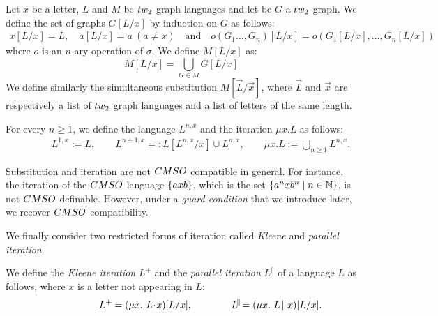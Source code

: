  \begin{definition}
  Let $x$ be a letter, $L$ and $M$ be $\TWT$ graph languages and let be $G$ a $\TWT$ graph. We define the set of graphs $G[L/x]$ by induction on $G$ as follows:
\begin{align*}
x[L/x]=L, \quad a[L/x]=a\ (a\neq x)\quad\text{and}\quad o(G_1\dots, G_n)[L/x]=o(G_1[L/x],\dots,G_n[L/x])  
\end{align*}
where $o$ is an $n$-ary operation of $\sigma$. We define $M[L/x]$ as:
$$ M[L/x]=\underset{G\in M}{\bigcup} G[L/x]$$
We define similarly the simultaneous  substitution $M[\vec{L}/\vec{x}]$, where $\vec{L}$ and $\vec{x}$ are  respectively a list of $\TWT$ graph languages and a list of letters of the same length.  
\smallskip

For every $n\geq 1$, we define the language $L^{n,x}$ and the iteration $\mu x. L$ as follows:
\begin{align*}
\qquad \qquad L^{1,x}:=L,\qquad L^{n+1,x}=:L[L^{n,x}/x]\cup L^{n,x}, \qquad \mu x. L:= \underset{n\geq 1}{\bigcup} L^{n,x}.
\end{align*}
\end{definition}


\begin{remark}
Substitution and iteration are not $\CMSO$ compatible in general. For instance, the iteration of the $\CMSO$ language $\left\{axb\right\}$, which is the set  $\left\{a^nxb^n \mid n\in \mathbb{N}\right\}$, is not $\CMSO$ definable.  
However, under a \emph{guard condition} that we introduce later, we recover $\CMSO$ compatibility.
\end{remark}

We finally consider two restricted forms of iteration called \emph{Kleene} and  \emph{parallel iteration}.

\begin{definition}
We define the \emph{Kleene iteration} $L^+$ and the \emph{parallel iteration} $L^\parallel$ of a language $L$ as follows, where $x$ is a letter not appearing in $L$:
\begin{align*}
\qquad \qquad \quad \quad L^+=(\mu x.\ L\!\cdot\! x)[L/x],\qquad \qquad L^{\!\parallel\!} =(\mu x.\ L
\!\parallel\!  x)[L/x].
\end{align*} 
\end{definition}


